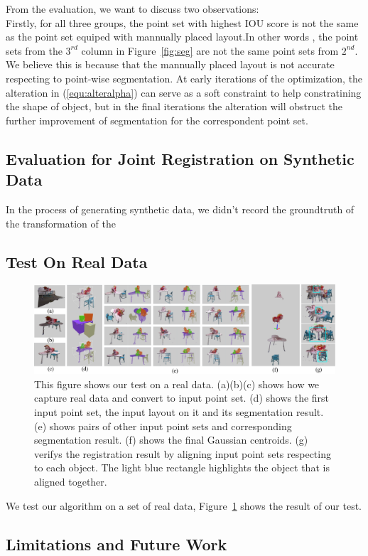 From the evaluation, we want to discuss two observations:\\
Firstly, for all three groups, the point set with highest IOU score is not the same as the point set equiped with mannually placed layout.In other words , the point sets from the $3^{rd}$ column in Figure~\ref{fig:seg} are not the same point sets from $2^{nd}$. We believe this is because that the mannually placed layout is not accurate respecting to point-wise segmentation. At early iterations of the optimization, the alteration in (\ref{equ:alteralpha}) can serve as a soft constraint to help constratining the shape of object, but in the final iterations the alteration will obstruct the further improvement of segmentation for the correspondent point set. 
\subsection{Evaluation for Joint Registration on Synthetic Data}
In the process of generating synthetic data, we didn't record the groundtruth of the transformation of the 
\subsection{Test On Real Data}
\begin{figure}[htb]
	\centering
	\includegraphics[width=\linewidth]{images/realdata/realdata}
	\caption{\label{fig:realdata}This figure shows our test on a real data. (a)(b)(c) shows how we capture real data and convert to input point set. (d) shows the first input point set, the input layout on it and its segmentation result. (e) shows pairs of other input point sets and corresponding segmentation result. (f) shows the final Gaussian centroids. (g) verifys the registration result by aligning input point sets respecting to each object. The light blue rectangle highlights the object that is aligned together. }
\end{figure}
We test our algorithm on a set of real data, Figure~{\ref{fig:realdata}} shows the result of our test.
\subsection{Limitations and Future Work}

